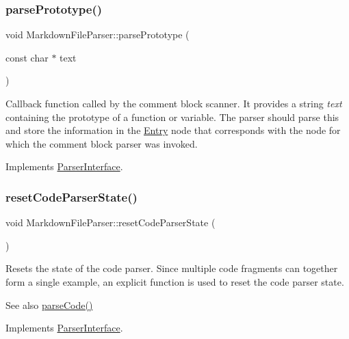 \subsubsection{\texorpdfstring{parsePrototype()}{parsePrototype()}}
{\footnotesize\ttfamily void Markdown\+File\+Parser\+::parse\+Prototype (\begin{DoxyParamCaption}\item[{const char $\ast$}]{text }\end{DoxyParamCaption})\hspace{0.3cm}{\ttfamily [virtual]}}

Callback function called by the comment block scanner. It provides a string {\itshape text} containing the prototype of a function or variable. The parser should parse this and store the information in the \mbox{\hyperlink{class_entry}{Entry}} node that corresponds with the node for which the comment block parser was invoked. 

Implements \mbox{\hyperlink{class_parser_interface_a5ebf0f524a296845befa22c85a4cc80b}{Parser\+Interface}}.

\mbox{\label{class_markdown_file_parser_a78b5337fc2b6a6dd1ee5ce104005e566}} 
\subsubsection{\texorpdfstring{resetCodeParserState()}{resetCodeParserState()}}
{\footnotesize\ttfamily void Markdown\+File\+Parser\+::reset\+Code\+Parser\+State (\begin{DoxyParamCaption}{ }\end{DoxyParamCaption})\hspace{0.3cm}{\ttfamily [virtual]}}

Resets the state of the code parser. Since multiple code fragments can together form a single example, an explicit function is used to reset the code parser state. \begin{DoxySeeAlso}{See also}
\mbox{\hyperlink{class_markdown_file_parser_a4413366ce7b6f7e41a2b232ce2ad6170}{parse\+Code()}} 
\end{DoxySeeAlso}


Implements \mbox{\hyperlink{class_parser_interface_aee4fccd1865a4e8a6b9f2896811104ca}{Parser\+Interface}}.

